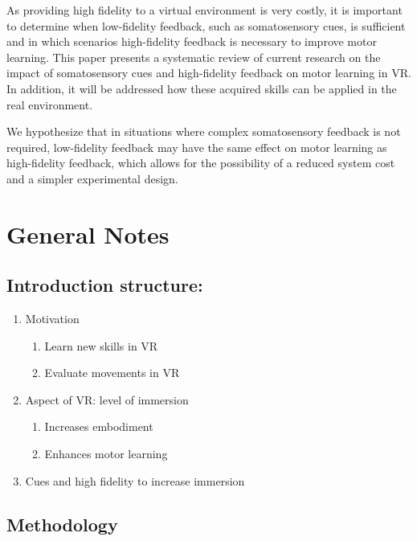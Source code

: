 \documentclass[conference]{IEEEtran}
\begin{document}
As providing high fidelity to a virtual environment is very costly, it is important to determine when low-fidelity feedback, such as somatosensory cues, is sufficient and in which scenarios high-fidelity feedback is necessary to improve motor learning. This paper presents a systematic review of current research on the impact of somatosensory cues and high-fidelity feedback on motor learning in VR. In addition, it will be addressed how these acquired skills can be applied in the real environment.

We hypothesize that in situations where complex somatosensory feedback is not required, low-fidelity feedback may have the same effect on motor learning as high-fidelity feedback, which allows for the possibility of a reduced system cost and a simpler experimental design.


\section{General Notes}

\subsection{Introduction structure:}
\begin{enumerate}
    \item Motivation
    \begin{enumerate}
        \item Learn new skills in VR
        \item Evaluate movements in VR
    \end{enumerate}
    \item Aspect of VR: level of immersion
    \begin{enumerate}
        \item Increases embodiment
        \item Enhances motor learning 
    \end{enumerate} 
    \item Cues and high fidelity to increase immersion
\end{enumerate}
\vspace{5mm}

\subsection{Methodology}
\end{document}
